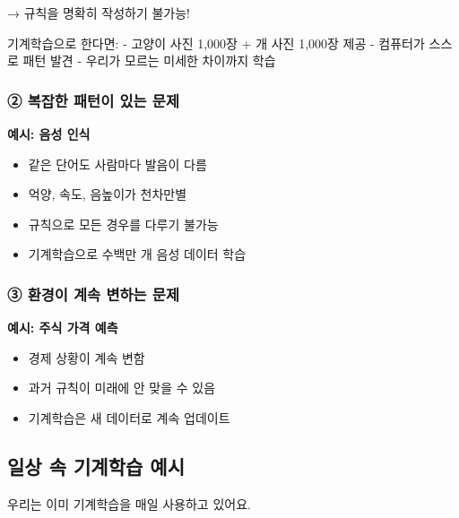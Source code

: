 \documentclass[a4paper, 11pt]{article}
\providecommand{\tightlist}{%
  \setlength{\itemsep}{0pt}\setlength{\parskip}{0pt}}
\begin{document}
→ 규칙을 명확히 작성하기 불가능!

기계학습으로 한다면: - 고양이 사진 1,000장 + 개 사진 1,000장 제공 -
컴퓨터가 스스로 패턴 발견 - 우리가 모르는 미세한 차이까지 학습

\hypertarget{uxbcf5uxc7a1uxd55c-uxd328uxd134uxc774-uxc788uxb294-uxbb38uxc81c}{%
\subsubsection{\textbf{②} 복잡한 패턴이 있는
문제}\label{uxbcf5uxc7a1uxd55c-uxd328uxd134uxc774-uxc788uxb294-uxbb38uxc81c}}

\textbf{예시: 음성 인식}

\begin{itemize}
\tightlist
\item
  같은 단어도 사람마다 발음이 다름
\item
  억양, 속도, 음높이가 천차만별
\item
  규칙으로 모든 경우를 다루기 불가능
\item
  기계학습으로 수백만 개 음성 데이터 학습
\end{itemize}

\hypertarget{uxd658uxacbduxc774-uxacc4uxc18d-uxbcc0uxd558uxb294-uxbb38uxc81c}{%
\subsubsection{\textbf{③} 환경이 계속 변하는
문제}\label{uxd658uxacbduxc774-uxacc4uxc18d-uxbcc0uxd558uxb294-uxbb38uxc81c}}

\textbf{예시: 주식 가격 예측}

\begin{itemize}
\tightlist
\item
  경제 상황이 계속 변함
\item
  과거 규칙이 미래에 안 맞을 수 있음
\item
  기계학습은 새 데이터로 계속 업데이트
\end{itemize}

\hypertarget{uxc77cuxc0c1-uxc18d-uxae30uxacc4uxd559uxc2b5-uxc608uxc2dc}{%
\subsection{일상 속 기계학습
예시}\label{uxc77cuxc0c1-uxc18d-uxae30uxacc4uxd559uxc2b5-uxc608uxc2dc}}

우리는 이미 기계학습을 매일 사용하고 있어요.
\end{document}

